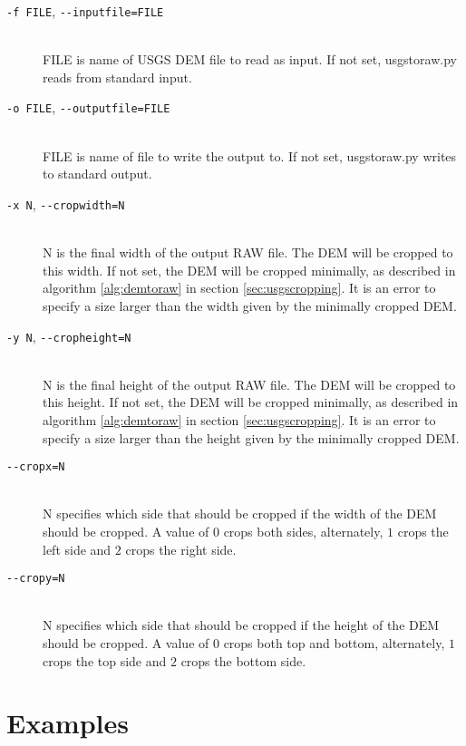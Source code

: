 \begin{description}
\item[\texttt{-f FILE}, \texttt{-{-}inputfile=FILE}] \hfill \\
FILE is name of USGS DEM file to read as input. If not set, usgstoraw.py reads from standard input.

\item[\texttt{-o FILE}, \texttt{-{-}outputfile=FILE}] \hfill \\
FILE is name of file to write the output to. If not set, usgstoraw.py writes to standard output.

\item[\texttt{-x N}, \texttt{-{-}cropwidth=N}] \hfill \\
N is the final width of the output RAW file. The DEM will be cropped to this width. If not set, the DEM will be cropped minimally, as described in algorithm \ref{alg:demtoraw} in section \ref{sec:usgscropping}. It is an error to specify a size larger than the width given by the minimally cropped DEM.

\item[\texttt{-y N}, \texttt{-{-}cropheight=N}] \hfill \\
N is the final height of the output RAW file. The DEM will be cropped to this height. If not set, the DEM will be cropped minimally, as described in algorithm \ref{alg:demtoraw} in section \ref{sec:usgscropping}. It is an error to specify a size larger than the height given by the minimally cropped DEM.

\item[\texttt{-{-}cropx=N}] \hfill \\
N specifies which side that should be cropped if the width of the DEM should be cropped. A value of $0$ crops both sides, alternately, $1$ crops the left side and $2$ crops the right side.

\item[\texttt{-{-}cropy=N}] \hfill \\
N specifies which side that should be cropped if the height of the DEM should be cropped. A value of $0$ crops both top and bottom, alternately, $1$ crops the top side and $2$ crops the bottom side.

\end{description}

\section*{Examples}

